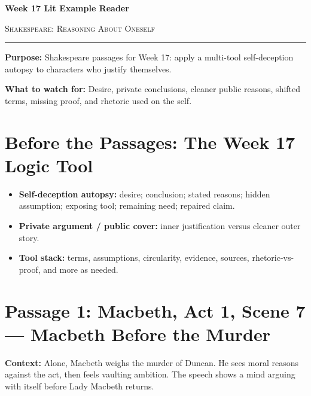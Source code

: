 \documentclass[12pt]{article}
\begin{document}
\begin{center}
{\LARGE\bfseries Week 17 Lit Example Reader}\par\vspace{0.02em}
{\large\scshape Shakespeare: Reasoning About Oneself}\par\vspace{0.06em}
\rule{0.78\textwidth}{0.5pt}
\end{center}

\textbf{Purpose:} Shakespeare passages for Week 17: apply a multi-tool self-deception autopsy to characters who justify themselves.

\textbf{What to watch for:} Desire, private conclusions, cleaner public reasons, shifted terms, missing proof, and rhetoric used on the self.

\section*{Before the Passages: The Week 17 Logic Tool}

\begin{itemize}[leftmargin=1.3em,itemsep=0.05em,topsep=0.08em,parsep=0.03em]
\item \textbf{Self-deception autopsy:} desire; conclusion; stated reasons; hidden assumption; exposing tool; remaining need; repaired claim.
\item \textbf{Private argument / public cover:} inner justification versus cleaner outer story.
\item \textbf{Tool stack:} terms, assumptions, circularity, evidence, sources, rhetoric-vs-proof, and more as needed.
\end{itemize}

\section*{Passage 1: Macbeth, Act 1, Scene 7 --- Macbeth Before the Murder}

\textbf{Context:} Alone, Macbeth weighs the murder of Duncan. He sees moral reasons against the act, then feels vaulting ambition. The speech shows a mind arguing with itself before Lady Macbeth returns.
\end{document}
